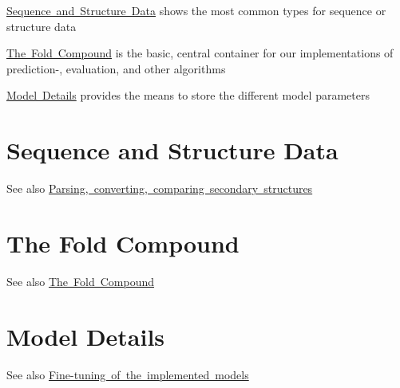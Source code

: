 
\begin{DoxyItemize}
\item \mbox{\hyperlink{sequence_structure_data}{Sequence and Structure Data}} shows the most common types for sequence or structure data
\item \mbox{\hyperlink{fold_compound_container}{The \textquotesingle{}Fold Compound\textquotesingle{}}} is the basic, central container for our implementations of prediction-\/, evaluation, and other algorithms
\item \mbox{\hyperlink{model_settings}{Model Details}} provides the means to store the different model parameters 
\end{DoxyItemize}\hypertarget{sequence_structure_data}{}\section{Sequence and Structure Data}\label{sequence_structure_data}
\begin{DoxySeeAlso}{See also}
\mbox{\hyperlink{group__struct__utils}{Parsing, converting, comparing secondary structures}} 
\end{DoxySeeAlso}
\hypertarget{fold_compound_container}{}\section{The \textquotesingle{}Fold Compound\textquotesingle{}}\label{fold_compound_container}
\begin{DoxySeeAlso}{See also}
\mbox{\hyperlink{group__fold__compound}{The Fold Compound}} 
\end{DoxySeeAlso}
\hypertarget{model_settings}{}\section{Model Details}\label{model_settings}
\begin{DoxySeeAlso}{See also}
\mbox{\hyperlink{group__model__details}{Fine-\/tuning of the implemented models}} 
\end{DoxySeeAlso}

